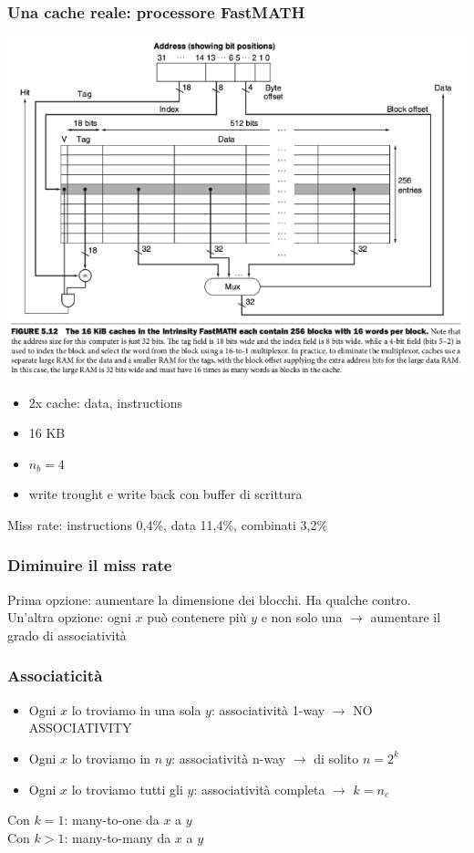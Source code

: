 \documentclass[12pt,a4paper]{article}
\begin{document}
\subsubsection{Una cache reale: processore FastMATH}
\begin{center}
\includegraphics[width=0.6\columnwidth]{img/fastmath.png}
\end{center}
\begin{itemize}
\item 2x cache: data, instructions
\item 16 KB
\item $n_b = 4$
\item write trought e write back con buffer di scrittura
\end{itemize}
Miss rate: instructions 0,4\%, data 11,4\%, combinati 3,2\%

\subsubsection{Diminuire il miss rate}
Prima opzione: aumentare la dimensione dei blocchi. Ha qualche contro.\\
Un'altra opzione: ogni $x$ può contenere più $y$ e non solo una $\rightarrow$ aumentare il grado di associatività

\subsubsection{Associaticità}
\begin{itemize}
\item Ogni $x$ lo troviamo in una sola $y$: associatività 1-way $\rightarrow$ NO ASSOCIATIVITY
\item Ogni $x$ lo troviamo in $n\ y$: associatività n-way $\rightarrow$ di solito $n = 2^k$
\item Ogni $x$ lo troviamo tutti gli $y$: associatività completa $\rightarrow$ $k=n_c$
\end{itemize}
Con $k=1$: many-to-one da $x$ a $y$\\
Con $k>1$: many-to-many da $x$ a $y$
\end{document}
